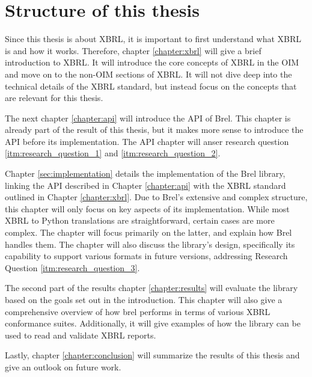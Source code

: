 \section{Structure of this thesis}

Since this thesis is about XBRL, it is important to first understand what XBRL is and how it works.
Therefore, chapter \ref{chapter:xbrl} will give a brief introduction to XBRL. 
It will introduce the core concepts of XBRL in the OIM and move on to the non-OIM sections of XBRL.
It will not dive deep into the technical details of the XBRL standard, but instead focus on the concepts that are relevant for this thesis.

The next chapter \ref{chapter:api} will introduce the API of Brel.
This chapter is already part of the result of this thesis, but it makes more sense to introduce the API before its implementation.
The API chapter will anser research question \ref{itm:research_question_1} and \ref{itm:research_question_2}.

Chapter \ref{sec:implementation} details the implementation of the Brel library, 
linking the API described in Chapter \ref{chapter:api} with the XBRL standard outlined in Chapter \ref{chapter:xbrl}. 
Due to Brel's extensive and complex structure, this chapter will only focus on key aspects of its implementation. 
While most XBRL to Python translations are straightforward, certain cases are more complex. 
The chapter will focus primarily on the latter, and explain how Brel handles them. 
The chapter will also discuss the library's design, specifically its capability to support various formats in future versions, 
addressing Research Question \ref{itm:research_question_3}.


The second part of the results chapter \ref{chapter:results} will evaluate the library based on the goals set out in the introduction.
This chapter will also give a comprehensive overview of how brel performs in terms of various XBRL conformance suites.
Additionally, it will give examples of how the library can be used to read and validate XBRL reports.

Lastly, chapter \ref{chapter:conclusion} will summarize the results of this thesis and give an outlook on future work.
